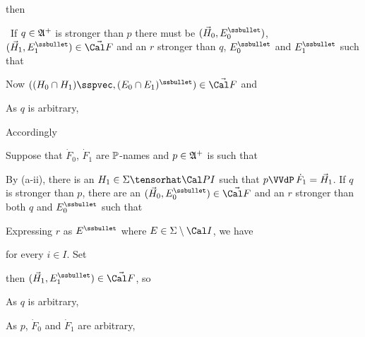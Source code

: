 {\noindent then


\noindent\Prf\ If $q\in\frak A^+$ is stronger than $p$ there must be
$(\vec H_0,E_0^{\ssbullet})$, $(\vec H_1,E_1^{\ssbullet})\in\vec{\Cal F}$
and an $r$ stronger than $q$, $E_0^{\ssbullet}$ and
$E_1^{\ssbullet}$ such that


\noindent Now
$((H_0\cap H_1)\sspvec,(E_0\cap E_1)^{\ssbullet})\in\vec{\Cal F}$ and


\noindent As $q$ is arbitrary,


Accordingly


\medskip

 Suppose that $\dot F_0$, $\dot F_1$ are $\Bbb P$-names and
$p\in\frak A^+$ is such that


\noindent By (a-ii), there is an $H_1\in\Sigma\tensorhat\Cal P I$ such
that $p\VVdP\,\dot F_1=\vec H_1$.   If $q$ is stronger than $p$, there are
an $(\vec H_0,E_0^{\ssbullet})\in\vec{\Cal F}$ and an $r$ stronger than
both $q$ and $E_0^{\ssbullet}$ such that


\noindent Expressing $r$ as $E^{\ssbullet}$ where
$E\in\Sigma\setminus\Cal I$, we have


\noindent for every $i\in I$.   Set


\noindent then $(\vec H_1,E_1^{\ssbullet})\in\vec{\Cal F}$, so


\noindent As $q$ is arbitrary,


\noindent As $p$, $\dot F_0$ and $\dot F_1$ are arbitrary,

}%

